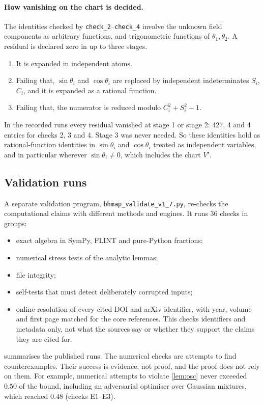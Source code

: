 \documentclass[11pt]{article}
\theoremstyle{plain}
\theoremstyle{definition}
\theoremstyle{remark}
\begin{document}
\paragraph{How vanishing on the chart is decided.}
The identities checked by \texttt{check\_2}--\texttt{check\_4} involve the unknown field components as arbitrary functions, and trigonometric functions of $\theta_1,\theta_2$. A residual is declared zero in up to three stages.
\begin{enumerate}
  \item It is expanded in independent atoms.
  \item Failing that, $\sin\theta_i$ and $\cos\theta_i$ are replaced by independent indeterminates $S_i$, $C_i$, and it is expanded as a rational function.
  \item Failing that, the numerator is reduced modulo $C_i^2 + S_i^2 - 1$.
\end{enumerate}
In the recorded runs every residual vanished at stage 1 or stage 2: 427, 4 and 4 entries for checks 2, 3 and 4. Stage 3 was never needed. So these identities hold as rational-function identities in $\sin\theta_i$ and $\cos\theta_i$ treated as independent variables, and in particular wherever $\sin\theta_i \neq 0$, which includes the chart $V'$.

\subsection{Validation runs}\label{app:validation}

A separate validation program, \texttt{bhmap\_validate\_v1\_7.py}, re-checks the computational claims with different methods and engines. It runs 36 checks in groups:
\begin{itemize}
  \item exact algebra in SymPy, FLINT and pure-Python fractions;
  \item numerical stress tests of the analytic lemmas;
  \item file integrity;
  \item self-tests that must detect deliberately corrupted inputs;
  \item online resolution of every cited DOI and arXiv identifier, with year, volume and first page matched for the core references. This checks identifiers and metadata only, not what the sources say or whether they support the claims they are cited for.
\end{itemize}
 summarises the published runs. The numerical checks are attempts to find counterexamples. Their success is evidence, not proof, and the proof does not rely on them. For example, numerical attempts to violate \cref{lem:osc} never exceeded $0.50$ of the bound, including an adversarial optimiser over Gaussian mixtures, which reached $0.48$ (checks E1--E3).
\end{document}
